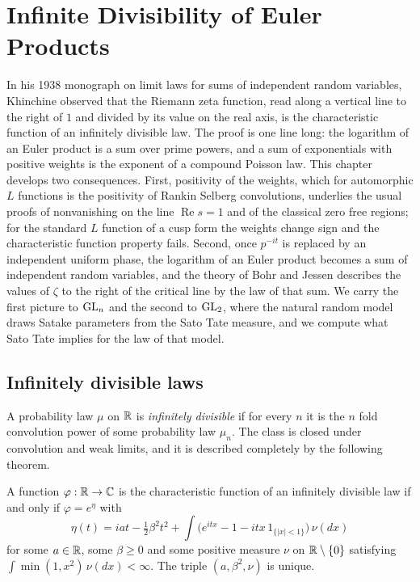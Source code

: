 \chapter{Infinite Divisibility of Euler Products}\label{ch:09}

In his 1938 monograph on limit laws for sums of independent random variables, Khinchine observed that the Riemann zeta function, read along a vertical line to the right of $1$ and divided by its value on the real axis, is the characteristic function of an infinitely divisible law. The proof is one line long: the logarithm of an Euler product is a sum over prime powers, and a sum of exponentials with positive weights is the exponent of a compound Poisson law. This chapter develops two consequences. First, positivity of the weights, which for automorphic $L$ functions is the positivity of Rankin Selberg convolutions, underlies the usual proofs of nonvanishing on the line $\operatorname{Re} s = 1$ and of the classical zero free regions; for the standard $L$ function of a cusp form the weights change sign and the characteristic function property fails. Second, once $p^{-it}$ is replaced by an independent uniform phase, the logarithm of an Euler product becomes a sum of independent random variables, and the theory of Bohr and Jessen describes the values of $\zeta$ to the right of the critical line by the law of that sum. We carry the first picture to $\mathrm{GL}_n$ and the second to $\mathrm{GL}_2$, where the natural random model draws Satake parameters from the Sato Tate measure, and we compute what Sato Tate implies for the law of that model.

\section{Infinitely divisible laws}

A probability law $\mu$ on $\mathbb{R}$ is \emph{infinitely divisible} if for every $n$ it is the $n$ fold convolution power of some probability law $\mu_n$. The class is closed under convolution and weak limits, and it is described completely by the following theorem.

\begin{theorem}\label{thm:ch09lk}
A function $\varphi:\mathbb{R}\to\mathbb{C}$ is the characteristic function of an infinitely divisible law if and only if $\varphi = e^{\eta}$ with
\[
\eta(t) = i a t - \tfrac12 \beta^2 t^2 + \int \bigl(e^{itx} - 1 - itx\,1_{\{|x|<1\}}\bigr)\,\nu(dx)
\]
for some $a\in\mathbb{R}$, some $\beta \ge 0$ and some positive measure $\nu$ on $\mathbb{R}\setminus\{0\}$ satisfying $\int \min(1,x^2)\,\nu(dx) < \infty$. The triple $(a,\beta^2,\nu)$ is unique.
\end{theorem}

